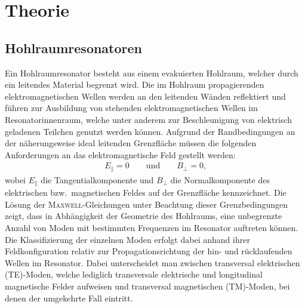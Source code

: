\chapter{Theorie}
\label{sec:theorie}


\section{Hohlraumresonatoren}
Ein Hohlraumresonator besteht aus einem evakuierten Hohlraum, welcher durch ein leitendes Material begrenzt wird.
Die im Hohlraum propagierenden elektromagnetischen Wellen werden an den leitenden Wänden reflektiert und führen zur Ausbildung von stehenden elektromagnetischen Wellen im Resonatorinnenraum, welche unter anderem zur Beschleunigung von elektrisch geladenen Teilchen genutzt werden können.
Aufgrund der Randbedingungen an der näherungsweise ideal leitenden Grenzfläche müssen die folgenden Anforderungen an das elektromagnetische Feld gestellt werden:
\begin{align}
  E_\parallel = 0 \qquad \text{und} \qquad B_\perp = 0\text{,}
  \label{eq:randbedingung_leiter}
\end{align}
wobei $E_\parallel$ die Tangentialkomponente und $B_\perp$ die Normalkomponente des elektrischen bzw.\ magnetischen Feldes auf der Grenzfläche kennzeichnet.
Die Lösung der \textsc{Maxwell}-Gleichungen unter Beachtung dieser Grenzbedingungen zeigt, dass in Abhängigkeit der Geometrie des Hohlraums, eine unbegrenzte Anzahl von Moden mit bestimmten Frequenzen im Resonator auftreten können.
Die Klassifizierung der einzelnen Moden erfolgt dabei anhand ihrer Feldkonfiguration relativ zur Propagationsrichtung der hin- und rücklaufenden Wellen im Resonator.
Dabei unterscheidet man zwischen transversal elektrischen (TE)-Moden, welche lediglich transversale elektrische und longitudinal magnetische Felder aufweisen und transversal magnetischen (TM)-Moden, bei denen der umgekehrte Fall eintritt.

